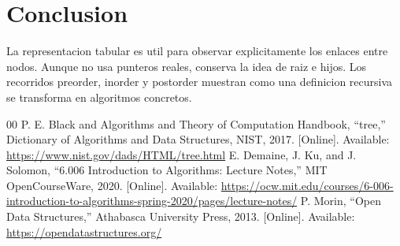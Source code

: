 \documentclass[conference]{IEEEtran}
\begin{document}
\section{Conclusion}
La representacion tabular es util para observar explicitamente los enlaces
entre nodos. Aunque no usa punteros reales, conserva la idea de raiz e hijos.
Los recorridos preorder, inorder y postorder muestran como una definicion
recursiva se transforma en algoritmos concretos.

\begin{thebibliography}{00}
 P. E. Black and Algorithms and Theory of Computation Handbook, ``tree,'' Dictionary of Algorithms and Data Structures, NIST, 2017. [Online]. Available: \url{https://www.nist.gov/dads/HTML/tree.html}
 E. Demaine, J. Ku, and J. Solomon, ``6.006 Introduction to Algorithms: Lecture Notes,'' MIT OpenCourseWare, 2020. [Online]. Available: \url{https://ocw.mit.edu/courses/6-006-introduction-to-algorithms-spring-2020/pages/lecture-notes/}
 P. Morin, ``Open Data Structures,'' Athabasca University Press, 2013. [Online]. Available: \url{https://opendatastructures.org/}
\end{thebibliography}
\end{document}
